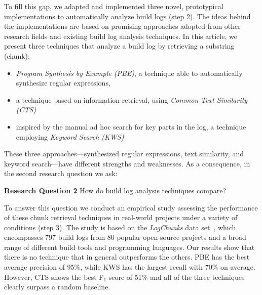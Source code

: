 To fill this gap, we adapted and implemented three novel, prototypical
implementations to
automatically analyze build logs (step 2).
The ideas behind the implementations are based on promising approaches
adopted from other research fields and existing build log analysis
techniques.
In this article, we present three techniques that analyze a build log
by retrieving a substring (chunk):
\begin{itemize}
	\item \emph{Program Synthesis by Example (PBE)}, a technique
	able to
	automatically synthesize regular expressions,
	\item a technique based on information
	retrieval, using \emph{Common Text Similarity (CTS)}
	\item inspired by the manual ad hoc search for key parts in the
	log, a
	technique employing \emph{Keyword Search (KWS)}
\end{itemize}
These three approaches---synthesized regular expressions,
text similarity, and
keyword search---have
different strengths and weaknesses.
As a consequence,
in the second research question we ask:

\begin{simplebox}[minipage boxed title*=-5cm]{\textbf{Research Question
2}}
How do build log analysis techniques compare?
\end{simplebox}

To answer this question
we conduct an empirical study assessing the performance
of these chunk retrieval techniques in
real-world projects under a variety of conditions (step 3).
The study is based on the \emph{LogChunks} data
set~\cite{brandt2020logchunks}, which encompasses 797 build logs from
80 popular open-source projects and a broad range of different
build tools and programming languages.
Our results show that there is no technique that in general outperforms
the others.
PBE has the best average precision of 95\%, while KWS has the largest
recall with 70\% on average.
However, CTS shows the best F$_{1}$-score
of 51\% and all of the three techniques
clearly surpass a random baseline.

